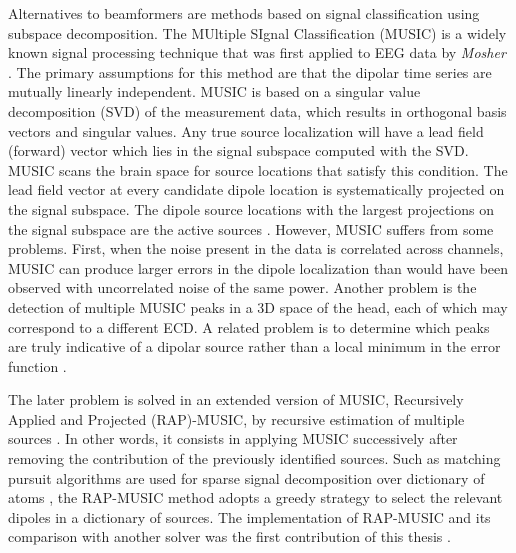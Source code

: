 Alternatives to beamformers are methods based on signal classification using subspace decomposition. The MUltiple SIgnal Classification (MUSIC) is a widely known signal processing technique that was first applied to EEG data by \textit{Mosher} \cite{mosher1992multiple}. The primary assumptions for this method are that the dipolar time series are mutually linearly independent. 
MUSIC is based on a singular value decomposition (SVD) of the measurement data, which results in orthogonal basis vectors and singular values. Any true source localization will have a lead field (forward) vector which lies in the signal subspace computed with the SVD. MUSIC scans the brain space for source locations that satisfy this condition. The lead field vector at every candidate dipole location is systematically projected on the signal subspace. The dipole source locations with the largest projections on the signal subspace are the active sources \cite{mosher1992multiple,mosher1999source}. However, MUSIC suffers from some problems. First, when the noise present in the data is correlated across channels, MUSIC can produce larger errors in the dipole localization than would have been observed with uncorrelated noise of the same power. Another problem is the detection of multiple MUSIC peaks in a 3D space of the head, each of which may correspond to a different ECD. A related problem is to determine which peaks are truly indicative of a dipolar source rather than a local minimum in the error function \cite{mosher1999source}.

The later problem is solved in an extended version of MUSIC, Recursively Applied and Projected (RAP)-MUSIC, by recursive estimation of multiple sources \cite{mosher1997source,mosher1999source}. In other words, it consists in applying MUSIC successively after removing the contribution of the previously identified sources. Such as matching pursuit algorithms are used for sparse signal decomposition over dictionary of atoms \cite{mallat1993matching}, the RAP-MUSIC method adopts a greedy strategy to select the relevant dipoles in a dictionary of sources. The implementation of RAP-MUSIC and its comparison with another solver was the first contribution of this thesis \cite{irMxNE}.

